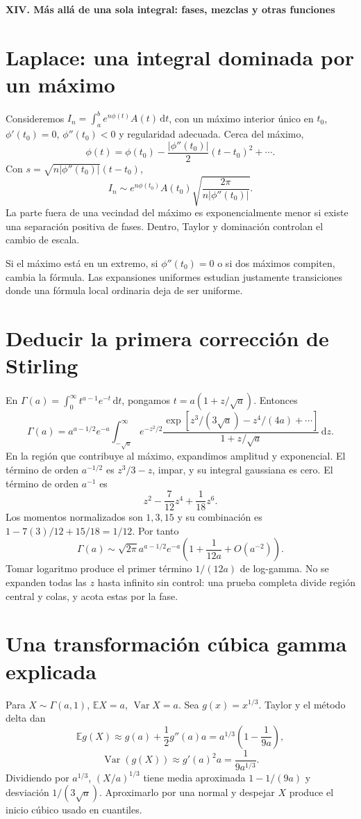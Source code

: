 \documentclass[11pt,a4paper]{article}
\newcommand{\E}{\mathbb E}
\newcommand{\dd}{\,\mathrm d}
\DeclareMathOperator{\Var}{Var}
\theoremstyle{definition}
\newcommand{\parte}[1]{\par\bigskip\Needspace{8\baselineskip}\begin{center}{\Large\bfseries\color{azul}#1}\end{center}}
\begin{document}
\parte{XIV. Más allá de una sola integral: fases, mezclas y otras funciones}
\section{Laplace: una integral dominada por un máximo}
Consideremos $I_n=\int_a^b e^{n\phi(t)}A(t)\dd t$, con un máximo interior único en $t_0$, $\phi'(t_0)=0$, $\phi''(t_0)<0$ y regularidad adecuada. Cerca del máximo,
\[
\phi(t)=\phi(t_0)-\frac{|\phi''(t_0)|}{2}(t-t_0)^2+\cdots.
\]
Con $s=\sqrt{n|\phi''(t_0)|}(t-t_0)$,
\[
I_n\sim e^{n\phi(t_0)}A(t_0)
\sqrt{\frac{2\pi}{n|\phi''(t_0)|}}.
\]
La parte fuera de una vecindad del máximo es exponencialmente menor si existe una separación positiva de fases. Dentro, Taylor y dominación controlan el cambio de escala.

Si el máximo está en un extremo, si $\phi''(t_0)=0$ o si dos máximos compiten, cambia la fórmula. Las expansiones uniformes estudian justamente transiciones donde una fórmula local ordinaria deja de ser uniforme.

\section{Deducir la primera corrección de Stirling}
En $\Gamma(a)=\int_0^\infty t^{a-1}e^{-t}\dd t$, pongamos $t=a(1+z/\sqrt a)$. Entonces
\[
\Gamma(a)=a^{a-1/2}e^{-a}\int_{-\sqrt a}^\infty
e^{-z^2/2}\frac{\exp[z^3/(3\sqrt a)-z^4/(4a)+\cdots]}
{1+z/\sqrt a}\dd z.
\]
En la región que contribuye al máximo, expandimos amplitud y exponencial. El término de orden $a^{-1/2}$ es $z^3/3-z$, impar, y su integral gaussiana es cero. El término de orden $a^{-1}$ es
\[
z^2-\frac7{12}z^4+\frac1{18}z^6.
\]
Los momentos normalizados son $1,3,15$ y su combinación es
$1-7(3)/12+15/18=1/12$. Por tanto
\[
\Gamma(a)\sim\sqrt{2\pi}a^{a-1/2}e^{-a}
\left(1+\frac1{12a}+O(a^{-2})\right).
\]
Tomar logaritmo produce el primer término $1/(12a)$ de log-gamma. No se expanden todas las $z$ hasta infinito sin control: una prueba completa divide región central y colas, y acota estas por la fase.

\section{Una transformación cúbica gamma explicada}
Para $X\sim\Gamma(a,1)$, $\E X=a$, $\Var X=a$. Sea $g(x)=x^{1/3}$. Taylor y el método delta dan
\[
\E g(X)\approx g(a)+\frac12g''(a)a
=a^{1/3}\left(1-\frac1{9a}\right),
\]
\[
\Var(g(X))\approx g'(a)^2a=\frac1{9a^{1/3}}.
\]
Dividiendo por $a^{1/3}$, $(X/a)^{1/3}$ tiene media aproximada $1-1/(9a)$ y desviación $1/(3\sqrt a)$. Aproximarlo por una normal y despejar $X$ produce el inicio cúbico usado en cuantiles.
\end{document}

